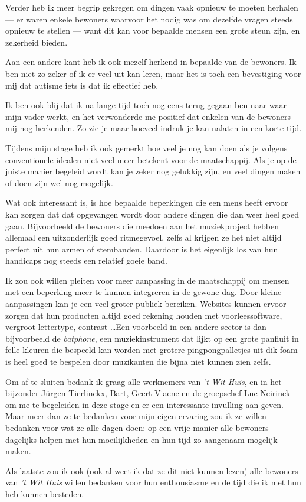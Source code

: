 \documentclass[a4paper,12pt]{article}
\begin{document}
Verder heb ik meer begrip gekregen om dingen vaak opnieuw te moeten herhalen --- er waren enkele bewoners waarvoor het nodig was om dezelfde vragen steeds opnieuw te stellen --- want dit kan voor bepaalde mensen een grote steun zijn, en zekerheid bieden.

Aan een andere kant heb ik ook mezelf herkend in bepaalde van de bewoners. Ik ben niet zo zeker of ik er veel uit kan leren, maar het is toch een bevestiging voor mij dat autisme iets is dat ik effectief heb.

Ik ben ook blij dat ik na lange tijd toch nog eens terug gegaan ben naar waar mijn vader werkt, en het verwonderde me positief dat enkelen van de bewoners mij nog herkenden. Zo zie je maar hoeveel indruk je kan nalaten in een korte tijd.

Tijdens mijn stage heb ik ook gemerkt hoe veel je nog kan doen als je volgens conventionele idealen niet veel meer betekent voor de maatschappij. Als je op de juiste manier begeleid wordt kan je zeker nog gelukkig zijn, en veel dingen maken of doen zijn wel nog mogelijk.

Wat ook interessant is, is hoe bepaalde beperkingen die een mens heeft ervoor kan zorgen dat dat opgevangen wordt door andere dingen die dan weer heel goed gaan. Bijvoorbeeld de bewoners die meedoen aan het muziekproject hebben allemaal een uitzonderlijk goed ritmegevoel, zelfs al krijgen ze het niet altijd perfect uit hun armen of stembanden. Daardoor is het eigenlijk los van hun handicaps nog steeds een relatief goeie band.

Ik zou ook willen pleiten voor meer aanpassing in de maatschappij om mensen met een beperking meer te kunnen integreren in de gewone dag. Door kleine aanpassingen kan je een veel groter publiek bereiken. Websites kunnen ervoor zorgen dat hun producten altijd goed rekening houden met voorleessoftware, vergroot lettertype, contrast \dots Een voorbeeld in een andere sector is dan bijvoorbeeld de \emph{batphone}, een muziekinstrument dat lijkt op een grote panfluit in felle kleuren die bespeeld kan worden met grotere pingpongpalletjes uit dik foam is heel goed te bespelen door muzikanten die bijna niet kunnen zien zelfs.

Om af te sluiten bedank ik graag alle werknemers van \emph{'t Wit Huis}, en in het bijzonder Jürgen Tierlinckx, Bart, Geert Viaene en de groepschef Luc Neirinck om me te begeleiden in deze stage en er een interessante invulling aan geven. Maar meer dan ze te bedanken voor mijn eigen ervaring zou ik ze willen bedanken voor wat ze alle dagen doen: op een vrije manier alle bewoners dagelijks helpen met hun moeilijkheden en hun tijd zo aangenaam mogelijk maken.

Als laatste zou ik ook (ook al weet ik dat ze dit niet kunnen lezen) alle bewoners van \emph{'t Wit Huis} willen bedanken voor hun enthousiasme en de tijd die ik met hun heb kunnen besteden.
\end{document}
